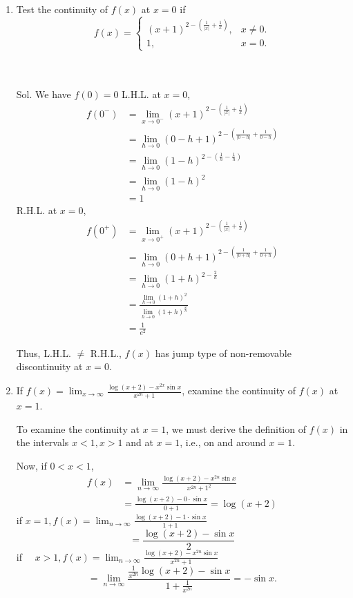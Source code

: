 \begin{enumerate}
\item Test the continuity of $f(x)$ at $x=0$ if
$$
f(x)=\left\{\begin{array}{cl}
(x+1)^{2-\left(\frac{1}{|x|}+\frac{1}{x}\right)}, & x \neq 0 . \\
1, & x=0 .
\end{array}\right.
$$\\\\

\begin{outline}
    Sol. We have $f(0)=0$
L.H.L. at $x=0$,
$$
\begin{aligned}
f\left(0^{-}\right) & =\lim _{x \rightarrow 0^{-}}(x+1)^{2-\left(\frac{1}{|x|}+\frac{1}{x}\right)} \\
& =\lim _{h \rightarrow 0}(0-h+1)^{2-\left(\frac{1}{|0-h|}+\frac{1}{0-h}\right)} \\
& =\lim _{h \rightarrow 0}(1-h)^{2-\left(\frac{1}{h}-\frac{1}{h}\right)} \\
& =\lim _{h \rightarrow 0}(1-h)^2 \\
& =1
\end{aligned}
$$
R.H.L. at $x=0$,
$$
\begin{aligned}
f\left(0^{+}\right) & =\lim _{x \rightarrow 0^{+}}(x+1)^{2-\left(\frac{1}{|x|}+\frac{1}{x}\right)} \\
& =\lim _{h \rightarrow 0}(0+h+1)^{2-\left(\frac{1}{|0+h|}+\frac{1}{0+h}\right)} \\
& =\lim _{h \rightarrow 0}(1+h)^{2-\frac{2}{h}} \\
& =\frac{\lim _{h \rightarrow 0}(1+h)^2}{\lim _{h \rightarrow 0}(1+h)^{\frac{2}{h}}} \\
& =\frac{1}{e^2}
\end{aligned}
$$

Thus, L.H.L. $\neq$ R.H.L., $f(x)$ has jump type of non-removable discontinuity at $x=0$.

\end{outline}
\item If $f(x)=\lim _{x \rightarrow \infty} \frac{\log (x+2)-x^{2 x} \sin x}{x^{2 n}+1}$,
examine the continuity of $f(x)$ at $x=1$.
\begin{outline}
To examine the continuity at $x=1$, we must derive the definition of $f(x)$ in the intervals $x<1, x>1$ and at $x=1$, i.e., on and around $x=1$.

Now, if $0<x<1$,
$$
\begin{aligned}
f(x) & =\lim _{n \rightarrow \infty} \frac{\log (x+2)-x^{2 n} \sin x}{x^{2 n}+1^2} \\
& =\frac{\log (x+2)-0 \cdot \sin x}{0+1}=\log (x+2)
\end{aligned}
$$
if $x=1, f(x)=\lim _{n \rightarrow \infty} \frac{\log (x+2)-1 \cdot \sin x}{1+1}$
$$
=\frac{\log (x+2)-\sin x}{2}
$$
if $\quad x>1, f(x)=\lim _{n \rightarrow \infty} \frac{\log (x+2)-x^{2 n} \sin x}{x^{2 n}+1}$
$$
=\lim _{n \rightarrow \infty} \frac{\frac{1}{x^{2 n}} \log (x+2)-\sin x}{1+\frac{1}{x^{2 n}}}=-\sin x .
$$


\end{outline}
\end{enumerate}
